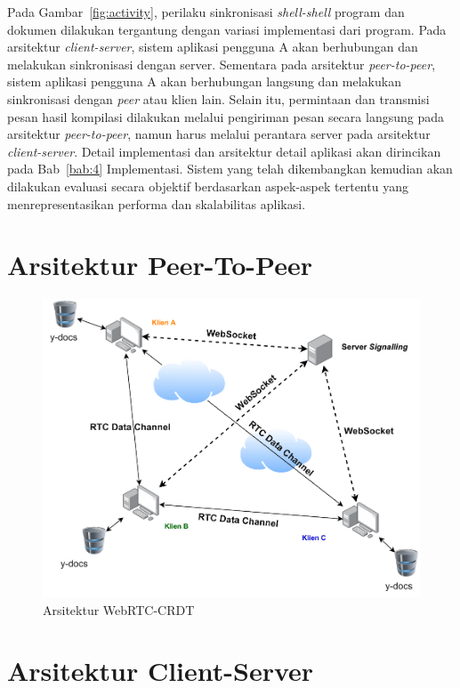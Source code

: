 Pada Gambar~\ref{fig:activity}, perilaku sinkronisasi \textit{shell-shell} program dan dokumen dilakukan tergantung dengan variasi implementasi dari program. Pada arsitektur \textit{client-server}, sistem aplikasi pengguna A akan berhubungan dan melakukan sinkronisasi dengan server. Sementara pada arsitektur \textit{peer-to-peer}, sistem aplikasi pengguna A akan berhubungan langsung dan melakukan sinkronisasi dengan \textit{peer} atau klien lain. Selain itu, permintaan dan transmisi pesan hasil kompilasi dilakukan melalui pengiriman pesan secara langsung pada arsitektur \textit{peer-to-peer}, namun harus melalui perantara server pada arsitektur \textit{client-server}. Detail implementasi dan arsitektur detail aplikasi akan dirincikan pada Bab~\ref{bab:4} Implementasi. Sistem yang telah dikembangkan kemudian akan dilakukan evaluasi secara objektif berdasarkan aspek-aspek tertentu yang menrepresentasikan performa dan skalabilitas aplikasi.

\section{Arsitektur Peer-To-Peer}

\begin{figure}
    \centering
    \includegraphics[scale=0.6]{assets/skripsi/Arsitektur_WebRTC_CRDT}
    \caption{Arsitektur WebRTC-CRDT}
\end{figure}

\section{Arsitektur Client-Server}

